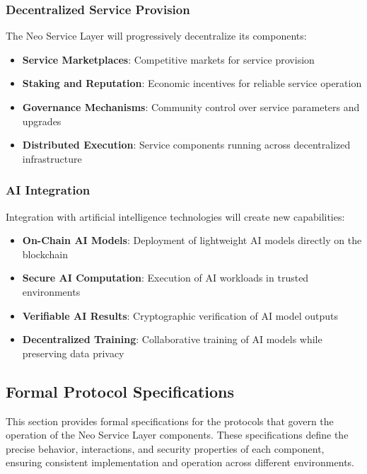 \documentclass{article}
\begin{document}
\subsubsection{Decentralized Service Provision}
\label{subsubsec:decentralized-service}

The Neo Service Layer will progressively decentralize its components:

\begin{itemize}
    \item \textbf{Service Marketplaces}: Competitive markets for service provision
    \item \textbf{Staking and Reputation}: Economic incentives for reliable service operation
    \item \textbf{Governance Mechanisms}: Community control over service parameters and upgrades
    \item \textbf{Distributed Execution}: Service components running across decentralized infrastructure
\end{itemize}

\subsubsection{AI Integration}
\label{subsubsec:ai-integration}

Integration with artificial intelligence technologies will create new capabilities:

\begin{itemize}
    \item \textbf{On-Chain AI Models}: Deployment of lightweight AI models directly on the blockchain
    \item \textbf{Secure AI Computation}: Execution of AI workloads in trusted environments
    \item \textbf{Verifiable AI Results}: Cryptographic verification of AI model outputs
    \item \textbf{Decentralized Training}: Collaborative training of AI models while preserving data privacy
\end{itemize}

\subsection{Formal Protocol Specifications}
\label{subsec:formal-protocols}

This section provides formal specifications for the protocols that govern the operation of the Neo Service Layer components. These specifications define the precise behavior, interactions, and security properties of each component, ensuring consistent implementation and operation across different environments.
\end{document}
